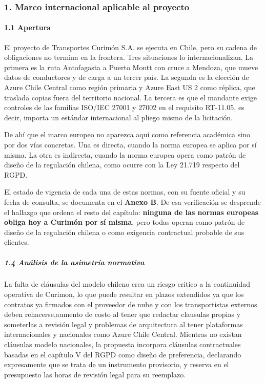 \subsubsection{1. Marco internacional aplicable al proyecto}\label{marco-internacional-aplicable-al-proyecto}

\paragraph{1.1 Apertura}\label{apertura}

El proyecto de Transportes Curimón S.A. se ejecuta en Chile, pero su cadena de obligaciones no termina en la frontera. Tres situaciones lo internacionalizan. La primera es la ruta Antofagasta a Puerto Montt con cruce a Mendoza, que mueve datos de conductores y de carga a un tercer país. La segunda es la elección de Azure Chile Central como región primaria y Azure East US 2 como réplica, que traslada copias fuera del territorio nacional. La tercera es que el mandante exige controles de las familias ISO/IEC 27001 y 27002 en el requisito RT-11.05, es decir, importa un estándar internacional al pliego mismo de la licitación.

De ahí que el marco europeo no aparezca aquí como referencia académica sino por dos vías concretas. Una es directa, cuando la norma europea se aplica por sí misma. La otra es indirecta, cuando la norma europea opera como patrón de diseño de la regulación chilena, como ocurre con la Ley 21.719 respecto del RGPD.

El estado de vigencia de cada una de estas normas, con su fuente oficial y su fecha de consulta, se documenta en el \textbf{Anexo B}. De esa verificación se desprende el hallazgo que ordena el resto del capítulo: \textbf{ninguna de las normas europeas obliga hoy a Curimón por sí misma}, pero todas operan como patrón de diseño de la regulación chilena o como exigencia contractual probable de sus clientes.

\subparagraph{1.4 Análisis de la asimetría normativa}\label{anuxe1lisis-de-la-asimetruxeda-normativa}

La falta de cláusulas del modelo chileno crea un riesgo critico a la continuidad operativa de Curimon, lo que puede resultar en plazos extendidos ya que los contratos ya firmados con el proveedor de nube y con los transportistas externos deben rehacerse,aumento de costo al tener que redactar clausulas propias y someterlas a revisión legal y problemas de arquitectura al tener plataformas internacionales y nacionales como Azure Chile Central. Mientras no existan cláusulas modelo nacionales, la propuesta incorpora cláusulas contractuales basadas en el capítulo V del RGPD como diseño de preferencia, declarando expresamente que se trata de un instrumento provisorio, y reserva en el presupuesto las horas de revisión legal para su reemplazo.

